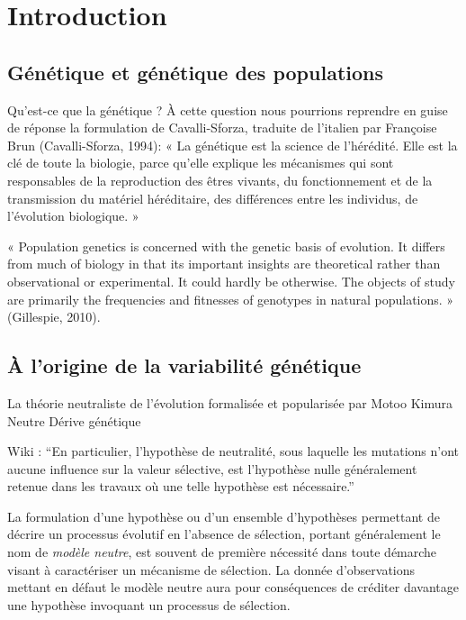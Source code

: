\documentclass[12pt,twoside]{reedthesis}
\begin{document}
  \chapter*{Introduction}\label{introduction}
  
  \section{Génétique et génétique des
  populations}\label{genetique-et-genetique-des-populations}
  
  Qu'est-ce que la génétique ? À cette question nous pourrions reprendre
  en guise de réponse la formulation de Cavalli-Sforza, traduite de
  l'italien par Françoise Brun (Cavalli-Sforza, 1994): « La génétique est
  la science de l'hérédité. Elle est la clé de toute la biologie, parce
  qu'elle explique les mécanismes qui sont responsables de la reproduction
  des êtres vivants, du fonctionnement et de la transmission du matériel
  héréditaire, des différences entre les individus, de l'évolution
  biologique. »
  
  « Population genetics is concerned with the genetic basis of evolution.
  It differs from much of biology in that its important insights are
  theoretical rather than observational or experimental. It could hardly
  be otherwise. The objects of study are primarily the frequencies and
  fitnesses of genotypes in natural populations. » (Gillespie, 2010).
  
  \section{À l'origine de la variabilité
  génétique}\label{a-lorigine-de-la-variabilite-genetique}
  
  La théorie neutraliste de l'évolution formalisée et popularisée par
  Motoo Kimura Neutre Dérive génétique
  
  Wiki : ``En particulier, l'hypothèse de neutralité, sous laquelle les
  mutations n'ont aucune influence sur la valeur sélective, est
  l'hypothèse nulle généralement retenue dans les travaux où une telle
  hypothèse est nécessaire.''
  
  La formulation d'une hypothèse ou d'un ensemble d'hypothèses permettant
  de décrire un processus évolutif en l'absence de sélection, portant
  généralement le nom de \textit{modèle neutre}, est souvent de première
  nécessité dans toute démarche visant à caractériser un mécanisme de
  sélection. La donnée d'observations mettant en défaut le modèle neutre
  aura pour conséquences de créditer davantage une hypothèse invoquant un
  processus de sélection.
  
\end{document}
